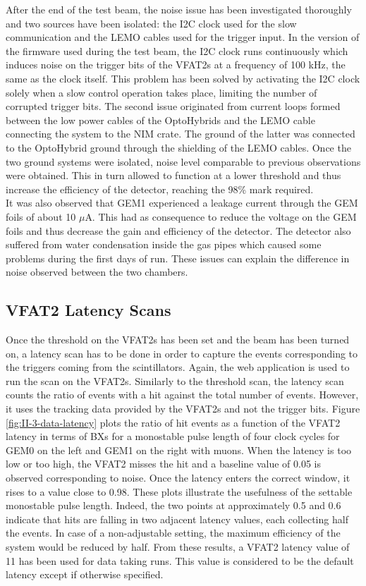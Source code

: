       After the end of the test beam, the noise issue has been investigated thoroughly and two sources have been isolated: the I2C clock used for the slow communication and the LEMO cables used for the trigger input. In the version of the firmware used during the test beam, the I2C clock runs continuously which induces noise on the trigger bits of the VFAT2s at a frequency of 100 kHz, the same as the clock itself. This problem has been solved by activating the I2C clock solely when a slow control operation takes place, limiting the number of corrupted trigger bits. The second issue originated from current loops formed between the low power cables of the OptoHybrids and the LEMO cable connecting the system to the NIM crate. The ground of the latter was connected to the OptoHybrid ground through the shielding of the LEMO cables. Once the two ground systems were isolated, noise level comparable to previous observations were obtained. This in turn allowed to function at a lower threshold and thus increase the efficiency of the detector, reaching the 98\% mark required. \\

      It was also observed that GEM1 experienced a leakage current through the GEM foils of about 10 $\mu$A. This had as consequence to reduce the voltage on the GEM foils and thus decrease the gain and efficiency of the detector. The detector also suffered from water condensation inside the gas pipes which caused some problems during the first days of run. These issues can explain the difference in noise observed between the two chambers.

    \subsection{VFAT2 Latency Scans}

      Once the threshold on the VFAT2s has been set and the beam has been turned on, a latency scan has to be done in order to capture the events corresponding to the triggers coming from the scintillators. Again, the web application is used to run the scan on the VFAT2s. Similarly to the threshold scan, the latency scan counts the ratio of events with a hit against the total number of events. However, it uses the tracking data provided by the VFAT2s and not the trigger bits. Figure \ref{fig:II-3-data-latency} plots the ratio of hit events as a function of the VFAT2 latency in terms of BXs for a monostable pulse length of four clock cycles for GEM0 on the left and GEM1 on the right with muons. When the latency is too low or too high, the VFAT2 misses the hit and a baseline value of 0.05 is observed corresponding to noise. Once the latency enters the correct window, it rises to a value close to 0.98. These plots illustrate the usefulness of the settable monostable pulse length. Indeed, the two points at approximately 0.5 and 0.6 indicate that hits are falling in two adjacent latency values, each collecting half the events. In case of a non-adjustable setting, the maximum efficiency of the system would be reduced by half. From these results, a VFAT2 latency value of 11 has been used for data taking runs. This value is considered to be the default latency except if otherwise specified. \\

